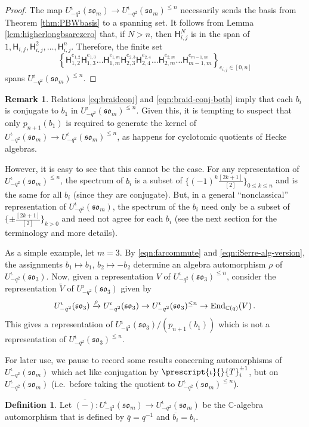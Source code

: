 \documentclass[10pt]{amsart}
\numberwithin{equation}{section}
\theoremstyle{definition}
\newtheorem{rem}[thm]{Remark}
\newtheorem{defn}[thm]{Definition}
\newcommand{\End}{{\rm End}}
\renewcommand{\to}{\rightarrow}
\let\tilde=\widetilde
\def\C{{\mathbb C}}
\newcommand{\som}[1][m]{\mathfrak{so}_{#1}}
\newcommand{\iqUsom}[1][m]{{U}^{\iota}_{-q^2}(\som[#1])}
\newcommand{\iQW}{\prescript{\iota}{}{T}}
\newcommand{\hh}{\mathsf{H}}
\begin{document}
\begin{proof}
The map $\iqUsom\rightarrow \iqUsom^{\le n}$ necessarily sends the basis from Theorem \ref{thm:PBWbasis} to a spanning set. 
It follows from Lemma \ref{lem:higherlongbsarezero} that, if $N> n$, 
then $\hh_{i,j}^N$ is in the span of $1, \hh_{i,j}, \hh_{i,j}^2, \dots, \hh_{i,j}^n$. 
Therefore, the finite set
\[
\left\{\hh_{1,2}^{e_{1,2}}\hh_{1,3}^{e_{1,3}}\dots \hh_{1,m}^{e_{1,m}}\hh_{2,3}^{e_{2,3}}\hh_{2,4}^{e_{2,4}}
	\dots \hh_{2,m}^{e_{2,m}}\dots \hh_{m-1,m}^{e_{m-1,m}}\right\}_{e_{i,j}\in [0, n]}
	\]
spans $\iqUsom^{\le n}$.
\end{proof}

\begin{rem}
Relations \eqref{eq:braidconj} and \eqref{eqn:braid-conj-both} imply that 
each $b_i$ is conjugate to $b_1$ in $\iqUsom^{\le n}$.
Given this, it is tempting to suspect that only $p_{n+1}(b_1)$ 
is required to generate the kernel of $\iqUsom \to \iqUsom^{\le n}$,
as happens for cyclotomic quotients of Hecke algebras.

However, it is easy to see that this cannot be the case. 
For any representation of $\iqUsom^{\le n}$, 
the spectrum of $b_i$ is a subset of $\{(-1)^k\tfrac{[2k+1]}{[2]}\}_{0 \leq k \leq n}$ 
and is the same for all $b_i$ (since they are conjugate).
But, in a general ``nonclassical'' representation of $\iqUsom$, 
the spectrum of the $b_i$ need only be a subset of $\{\pm \tfrac{[2k+1]}{[2]}\}_{k > 0}$ 
and need not agree for each $b_i$ (see the next section for the terminology and more details).

As a simple example, let $m=3$. 
By \eqref{eqn:farcommute} and \eqref{eqn:iSerre-alg-version}, 
the assignments $b_1 \mapsto b_1$, $b_2 \mapsto -b_2$ determine an algebra 
automorphism $\rho$ of $\iqUsom[3]$.
Now, given a representation $V$ of $\iqUsom[3]^{\le n}$, 
consider the representation $\tilde{V}$ of $\iqUsom[3]$ given by
\[
\iqUsom[3] \xrightarrow{\rho} \iqUsom[3] \to \iqUsom[3]^{\le n} \to \End_{\C(q)}(V) \, .
	\]
This gives a representation of $\iqUsom[3] / (p_{n+1}(b_1))$ 
which is not a representation of $\iqUsom[3]^{\le n}$.
	\end{rem}
	
For later use, we pause to record some results concerning automorphisms of $\iqUsom$ 
which act like conjugation by $\iQW_i^{\pm 1}$, 
but on $\iqUsom$ (i.e.~before taking the quotient to $\iqUsom^{\le n}$). 

\begin{defn}
Let $\overline{(-)} \colon \iqUsom\rightarrow \iqUsom$ be the $\C$-algebra automorphism that is defined by 
$\overline{q}=q^{-1}$ and $\overline{b_i} = b_i$.
\end{defn}
\end{document}
